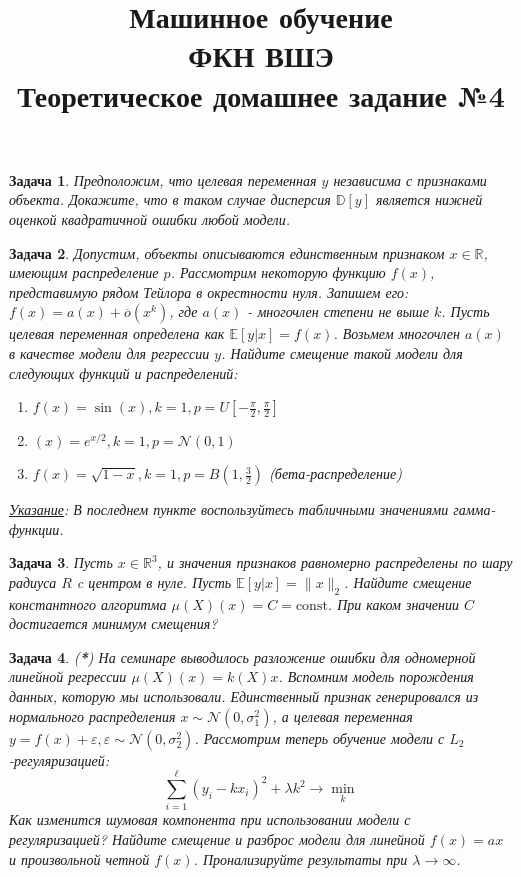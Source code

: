 \documentclass[12pt,fleqn]{article}
\title{Машинное обучение\\ФКН ВШЭ\\Теоретическое домашнее задание №4}
\author{}
\date{}
\newtheorem{esProblem}{Задача}
\begin{document}
\maketitle

\begin{esProblem}
    Предположим, что целевая переменная $y$ независима с признаками объекта. Докажите, что в таком случае дисперсия $\mathbb{D}[y]$ является нижней оценкой квадратичной ошибки любой модели.
\end{esProblem}

\begin{esProblem}
    Допустим, объекты описываются единственным признаком $x \in \mathbb{R}$, имеющим распределение $p$. Рассмотрим некоторую функцию $f(x)$, представимую рядом Тейлора в окрестности нуля. Запишем его: $f(x) = a(x) + \overline{o}(x^k)$, где $a(x)$ - многочлен степени не выше $k$. Пусть целевая переменная определена как $\mathbb{E}[y|x] = f(x)$. Возьмем многочлен $a(x)$ в качестве модели для регрессии $y$. Найдите смещение такой модели для следующих функций и распределений:
    
    \begin{enumerate}
        \item $f(x) = \sin(x), k = 1, p = U[-\frac{\pi}{2}, \frac{\pi}{2}]$
        \item $(x) = e^{x/2}, k = 1, p = \mathcal{N}(0, 1)$
        \item $f(x) = \sqrt{1 - x}, k = 1, p = B(1, \frac{3}{2})$ (бета-распределение)
    \end{enumerate}
    
    \noindent
    \underline{\it Указание}: В последнем пункте воспользуйтесь табличными значениями гамма-функции.
\end{esProblem}

\begin{esProblem}
    Пусть $x \in \mathbb{R}^3$, и значения признаков равномерно распределены по шару радиуса $R$ c центром в нуле. Пусть $\mathbb{E}[y|x] = \|x\|_2$. Найдите смещение константного алгоритма $\mu(X)(x) = C = \text{const}$. При каком значении $C$ достигается минимум смещения?
\end{esProblem}

\begin{esProblem}
    (\textbf{*}) На семинаре выводилось разложение ошибки для одномерной линейной регрессии $\mu(X)(x) = k(X)x$. Вспомним модель порождения данных, которую мы использовали. Единственный признак генерировался из нормального распределения $x \sim \mathcal{N}(0, \sigma_1^2)$, а целевая переменная $y = f(x) + \varepsilon, \varepsilon \sim \mathcal{N}(0, \sigma_2^2)$. Рассмотрим теперь обучение модели с $L_2$-регуляризацией: 
    $$
    \sum_{i=1}^{\ell} (y_i - k x_i)^2 + \lambda k^2 \rightarrow \displaystyle\min_k
    $$
    Как изменится шумовая компонента при использовании модели с регуляризацией? Найдите смещение и разброс модели для линейной $f(x) = ax$ и произвольной четной $f(x)$. Пронализируйте результаты при $\lambda \rightarrow \infty$.
\end{esProblem}
\end{document}
